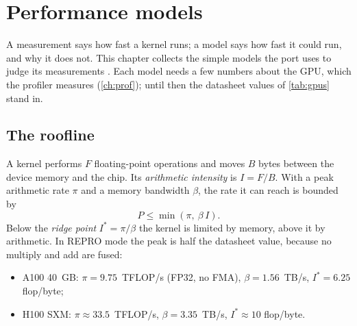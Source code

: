 \chapter{Performance models}\label{ch:perf}

A measurement says how fast a kernel runs; a model says how fast it could run, and why it does not. This chapter
collects the simple models the port uses to judge its measurements \citep{williams2009}. Each model needs a few
numbers about the GPU, which the profiler measures (\cref{ch:prof}); until then the datasheet values of
\cref{tab:gpus} stand in.

\section{The roofline}

A kernel performs $F$ floating-point operations and moves $B$ bytes between the device memory and the chip. Its
\emph{arithmetic intensity} is $I = F/B$. With a peak arithmetic rate $\pi$ and a memory bandwidth $\beta$, the rate
it can reach is bounded by
\begin{equation}
  P \le \min(\pi,\ \beta\, I).
  \label{eq:roofline}
\end{equation}
Below the \emph{ridge point} $I^* = \pi/\beta$ the kernel is limited by memory, above it by arithmetic. In REPRO mode
the peak is half the datasheet value, because no multiply and add are fused:
\begin{itemize}
  \item A100 40~GB: $\pi = 9.75$~TFLOP/s (FP32, no FMA), $\beta = 1.56$~TB/s, $I^* = 6.25$ flop/byte;
  \item H100 SXM: $\pi \approx 33.5$~TFLOP/s, $\beta = 3.35$~TB/s, $I^* \approx 10$ flop/byte.
\end{itemize}

